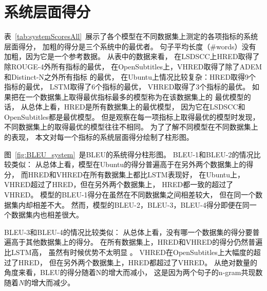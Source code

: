 \section{系统层面得分}\label{sec:system_scores}
表~\ref{tab:systemScoresAll}~展示了各个模型在不同数据集上测定的各项指标的系统层面得分， 加粗的得分是三个系统中的最优者。 句子平均长度（\#words）没有加粗，因为它是一个参考数据。 从表中的数据来看， 在LSDSCC上HRED取得了除ROUGE-4外所有指标的最优， 在OpenSubtitles上，VHRED取得了除了ADEM和Distinct-N之外所有指标 的最优， 在Ubuntu上情况比较复杂：HRED取得9个指标的最优， LSTM取得了6个指标的最优， VHRED取得了3个指标的最优。 如果把在一个数据集上取得最优指标最多的模型称为在该数据集上的 最优模型的话， 从总体上看，HRED是所有数据集上的最优模型， 因为它在LSDSCC和OpenSubtitles都是最优模型。 但是观察在每一项指标上取得最优的模型时发现， 不同数据集上的取得最优的模型往往不相同。 为了了解不同模型在不同数据集上的表现， 本文对每一个指标的系统层面得分绘制了柱形图。


图~\ref{fig:BLEU_system}~是BLEU的系统得分柱形图。 BLEU-1和BLEU-2的情况比较类似： 从总体上看，模型在Ubuntu的得分普遍高于在另外两个数据集上的得分， 而HRED和VHRED在所有数据集上都比LSTM表现好， 在Ubuntu上，VHRED超过了HRED，但在另外两个数据集上， HRED都一致的超过了VHRED。 模型的BLEU-1得分在虽然在不同数据集之间相差较大， 但在同一个数据集内却相差不大。 然而，模型的BLEU-2，BLEU-3，BLEU-4得分即便在同一个数据集内也相差很大。

BLEU-3和BLEU-4的情况比较类似： 从总体上看，没有哪一个数据集的得分要普遍高于其他数据集上的得分。 在所有数据集上，HRED和VHRED的得分仍然普遍比LSTM高， 虽然有时候优势不太明显 。 VHRED在OpenSubtitles上大幅度的超过了HRED， 但在另外两个数据集上，HRED都超过了VHRED。 从绝对数量的角度来看，BLEU的得分随着N的增大而减小， 这是因为两个句子的n-gram共现数随着$N$的增大而减少。


